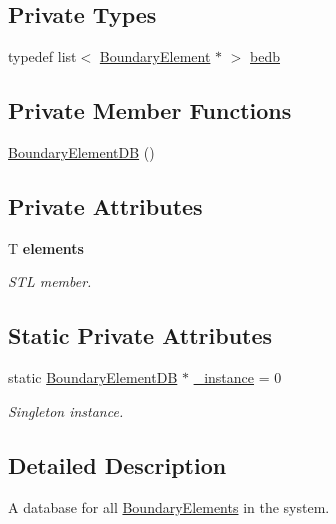 \subsection*{Private Types}
\begin{DoxyCompactItemize}
\item 
typedef list$<$ \hyperlink{classBoundaryElement}{Boundary\+Element} $\ast$ $>$ \hyperlink{classBoundaryElementDB_af2b807e8b6e93168ee80bc57182b7b34}{bedb}
\end{DoxyCompactItemize}
\subsection*{Private Member Functions}
\begin{DoxyCompactItemize}
\item 
\hyperlink{classBoundaryElementDB_a71f6fba6551793efc93ffc60a2b246a6}{Boundary\+Element\+D\+B} ()
\end{DoxyCompactItemize}
\subsection*{Private Attributes}
\begin{DoxyCompactItemize}
\item 
T {\bfseries elements}
\begin{DoxyCompactList}\small\item\em S\+T\+L member. \end{DoxyCompactList}\end{DoxyCompactItemize}
\subsection*{Static Private Attributes}
\begin{DoxyCompactItemize}
\item 
static \hyperlink{classBoundaryElementDB}{Boundary\+Element\+D\+B} $\ast$ \hyperlink{classBoundaryElementDB_af537420197d88dcca76a50db7d7b7079}{\+\_\+instance} = 0
\begin{DoxyCompactList}\small\item\em Singleton instance. \end{DoxyCompactList}\end{DoxyCompactItemize}


\subsection{Detailed Description}
A database for all \hyperlink{classBoundaryElement}{Boundary\+Elements} in the system. 

